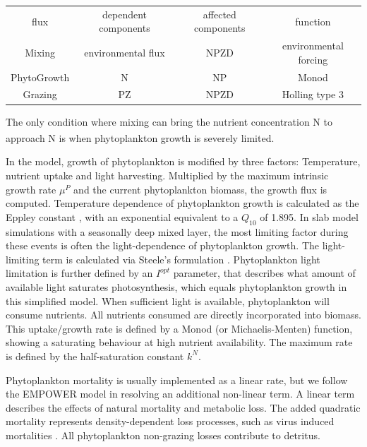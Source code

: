 \documentclass[template.tex]{subfiles}
\begin{document}
\begin{tabular}{c|c|c|c}
flux & dependent components & affected components & function \\
Mixing & environmental flux & NPZD & environmental forcing \\
PhytoGrowth & N & NP & Monod \\
Grazing & PZ & NPZD & Holling type 3\\
\end{tabular}


The only condition where mixing can bring the nutrient concentration N to approach \unit{N^\emptyset} is when phytoplankton growth is severely limited. 

In the model, growth of phytoplankton is modified by three factors: Temperature, nutrient uptake and light harvesting. Multiplied by the maximum intrinsic growth rate $\mu^P$ and the current phytoplankton biomass, the growth flux is computed. 
Temperature dependence of phytoplankton growth is calculated as the Eppley constant \citep{Eppley1972TemperatureSea}, with an exponential equivalent to a $Q_{10}$ of 1.895.
In slab model simulations with a seasonally deep mixed layer, the most limiting factor during these events is often the light-dependence of phytoplankton growth. The light-limiting term is calculated via Steele's formulation \citep{Steele1962EnvironmentalSea}. Phytoplankton light limitation is further defined by an $I^{opt}$ parameter, that describes what amount of available light saturates photosynthesis, which equals phytoplankton growth in this simplified model.
When sufficient light is available, phytoplankton will consume nutrients. All nutrients consumed are directly incorporated into biomass. This uptake/growth rate is defined by a Monod (or Michaelis-Menten) function, showing a saturating behaviour at high nutrient availability. The maximum rate is defined by the half-saturation constant $k^N$. 

Phytoplankton mortality is usually implemented as a linear rate, but we follow the EMPOWER model in resolving an additional non-linear term. A linear term describes the effects of natural mortality and metabolic loss. The added quadratic mortality represents density-dependent loss processes, such as virus induced mortalities \citep{Anderson2015c}.  
All phytoplankton non-grazing losses contribute to detritus.\\
\end{document}

